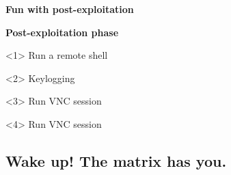 \begin{frame}[plain]
    \begin{center}
      \Huge\bfseries
      Fun with post-exploitation
    \end{center}
\end{frame}

\begin{frame}[plain]
  \begin{center}
    \LARGE\bfseries
    Post-exploitation phase
  \end{center}

  \vspace{.5cm}

  \begin{onlyenv}<1>
    Run a remote shell
    \begin{center}
    \end{center}
  \end{onlyenv}

  \begin{onlyenv}<2>
    Keylogging
    \begin{center}
    \end{center}
  \end{onlyenv}


  \begin{onlyenv}<3>
    Run VNC session
    \begin{center}
    \end{center}
  \end{onlyenv}

  \begin{onlyenv}<4>
    Run VNC session
    \begin{center}
    \end{center}
  \end{onlyenv}

\end{frame}

\subsection{Wake up! The matrix has you.}

